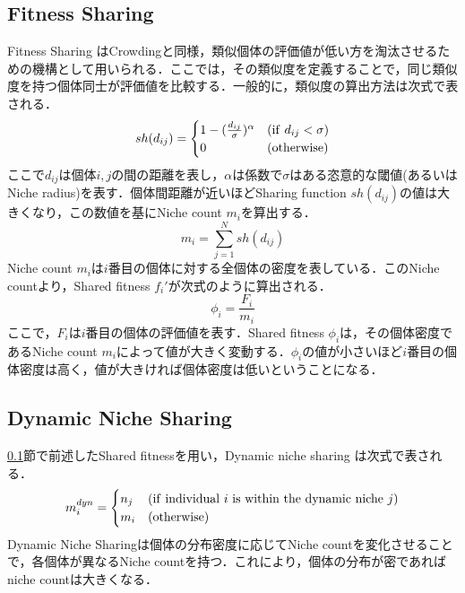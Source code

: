 \documentclass[a4j,11pt]{jarticle}
\begin{document}
\subsection{Fitness Sharing}
\label{ss:fs}
Fitness Sharing \cite{FS} はCrowdingと同様，類似個体の評価値が低い方を淘汰させるための機構として用いられる．ここでは，その類似度を定義することで，同じ類似度を持つ個体同士が評価値を比較する．一般的に，類似度の算出方法は次式で表される．
\begin{equation}
\label{eq:sfunc}
sh(d_{ij})= \begin{cases}
1-(\frac{d_{ij}}{\sigma})^\alpha & ({\rm if} \ d_{ij} < \sigma)\\
0 & ({\rm otherwise})
\end{cases}
\end{equation}
ここで$d_{ij}$は個体$i,j$の間の距離を表し，$\alpha$は係数で$\sigma$はある恣意的な閾値(あるいはNiche radius)を表す．個体間距離が近いほどSharing function $sh(d_{ij})$の値は大きくなり，この数値を基にNiche count $m_i$を算出する．
\begin{equation}
\label{eq:nc}
m_i=\sum_{j=1}^N sh(d_{ij})
\end{equation}
Niche count $m_i$は$i$番目の個体に対する全個体の密度を表している．このNiche countより，Shared fitness $f_i'$が次式のように算出される．
\begin{equation}
\label{eq:sfit}
\phi_i=\frac{F_i}{m_i}
\end{equation}
ここで，$F_i$は$i$番目の個体の評価値を表す．Shared fitness $\phi_i$は，その個体密度であるNiche count $m_i$によって値が大きく変動する．$\phi_i$の値が小さいほど$i$番目の個体密度は高く，値が大きければ個体密度は低いということになる．

\subsection{Dynamic Niche Sharing}
\label{ss:dns}
\ref{ss:fs}節で前述したShared fitnessを用い，Dynamic niche sharing \cite{DNS} は次式で表される．
\begin{equation}
\label{eq:dns}
m_i^{dyn}=\begin{cases}
n_j & ({\rm if \ individual}\ i {\rm \ is \ within \ the \ dynamic \ niche }\ j) \\
m_i & ({\rm otherwise})
\end{cases}
\end{equation}
Dynamic Niche Sharingは個体の分布密度に応じてNiche countを変化させることで，各個体が異なるNiche countを持つ．これにより，個体の分布が密であればniche countは大きくなる．
\end{document}
